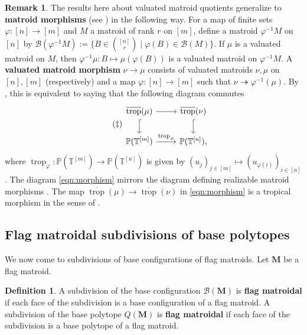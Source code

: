 \documentclass[11pt]{amsart}
\newcommand{\PP}{\mathbb P}
\newcommand{\TT}{\mathbb T}
\newcommand{\trop}{\operatorname{trop}}
\newcommand{\bb}{\mathcal B}
\newcommand{\MM}{{\boldsymbol M}}
\theoremstyle{definition}
\newtheorem{defn}[thm]{Definition}
\newtheorem{rem}[thm]{Remark}
\newcommand{\chris}[1]{{\color{cyan} \sf Chris: [#1]}}
\begin{document}
\begin{rem}
The results here about valuated matroid quotients generalize to \textbf{matroid morphisms} (see \cite{EH20}) in the following way.  For a map of finite sets $\varphi: [n] \to [m]$ and $M$ a matroid of rank $r$ on $[m]$, define a matroid $\varphi^{-1}M$ on $[n]$ by $\bb(\varphi^{-1}M) := \{B\in \binom{[n]}{r} \mid \varphi(B) \in \bb(M)\}$.  If $\mu$ is a valuated matroid on $M$, then $\varphi^{-1}\mu: B \mapsto \mu(\varphi(B))$ is a valuated matroid on $\varphi^{-1}M$.  
A \textbf{valuated matroid morphism} $\nu\to \mu$ consists of valuated matroids $\nu, \mu$ on $[n], [m]$ (respectively) and a map $\varphi: [n]\to [m]$ such that $\nu \twoheadrightarrow \varphi^{-1}(\mu)$.  By , this is equivalent to saying that the following diagram commutes
\begin{equation}\label{eqn:morphism}\tag{$\ddagger$}
\begin{tikzcd}
\overline{\trop}(\mu) \arrow[r] \arrow[d, hook] &\overline{\trop}(\nu) \arrow[d, hook]\\
\PP(\TT^{[m]}) \arrow[r, "\trop_\varphi"] &\PP(\TT^{[n]}),
\end{tikzcd}
\end{equation}
where $\trop_{\varphi}: \PP(\TT^{[m]}) \to \PP(\TT^{[n]})$ is given by $(u_{j})_{j\in [m]} \mapsto (u_{\varphi(i)})_{i\in [n]}$.  The diagram \eqref{eqn:morphism} mirrors the diagram defining realizable matroid morphisms \cite[Remark 2.1]{EH20}.  The map $\overline{\trop}(\mu) \to \overline{\trop}(\nu)$ in \eqref{eqn:morphism} is a tropical morphism in the sense of \cite{Mik06}.
\end{rem}

\subsection{Flag matroidal subdivisions of base polytopes}
\label{subsec:flagmatsubdiv}

We now come to subdivisions of base configurations of flag matroids. Let $\MM$ be a flag matroid.  


\begin{defn}
 A subdivision of the base configuration $\bb(\MM)$ is \textbf{flag matroidal} if each face of the subdivision is a base configuration of a flag matroid.  A subdivision of the base polytope $Q(\MM)$ is \textbf{flag matroidal} if each face of the subdivision is a base polytope of a flag matroid.  
\end{defn}
\end{document}
